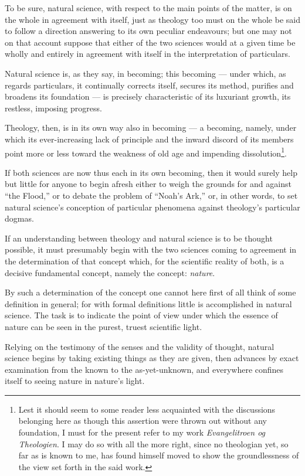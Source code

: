 \documentclass[12pt,a4paper]{article}
\begin{document}
To be sure, natural science, with respect to the main points of the matter, is
on the whole in agreement with itself, just as theology too must on the whole be
said to follow a direction answering to its own peculiar endeavours; but one may
not on that account suppose that either of the two sciences would at a given time
be wholly and entirely in agreement with itself in the interpretation of
particulars.

Natural science is, as they say, in becoming; this becoming --- under which, as
regards particulars, it continually corrects itself, secures its method,
purifies and broadens its foundation --- is precisely characteristic of its
luxuriant growth, its restless, imposing progress.

Theology, then, is in its own way also in becoming --- a becoming, namely, under
which its ever-increasing lack of principle and the inward discord of its members
point more or less toward the weakness of old age and impending
dissolution\footnote{Lest it should seem to some reader less acquainted with the
discussions belonging here as though this assertion were thrown out without any
foundation, I must for the present refer to my work \emph{Evangelitroen og
Theologien}. I may do so with all the more right, since no theologian yet, so far
as is known to me, has found himself moved to show the groundlessness of the view
set forth in the said work.}.

If both sciences are now thus each in its own becoming, then it would surely help
but little for anyone to begin afresh either to weigh the grounds for and against
``the Flood,'' or to debate the problem of ``Noah's Ark,'' or, in other words, to
set natural science's conception of particular phenomena against theology's
particular dogmas.

If an understanding between theology and natural science is to be thought
possible, it must presumably begin with the two sciences coming to agreement in
the determination of that concept which, for the scientific reality of both, is a
decisive fundamental concept, namely the concept: \emph{nature}.

By such a determination of the concept one cannot here first of all think of some
definition in general; for with formal definitions little
is accomplished in natural science. The task is to indicate the point of view
under which the essence of nature can be seen in the purest, truest scientific
light.

Relying on the testimony of the senses and the validity of thought, natural
science begins by taking existing things as they are given, then advances by
exact examination from the known to the as-yet-unknown, and everywhere confines
itself to seeing nature in nature's light.
\end{document}

